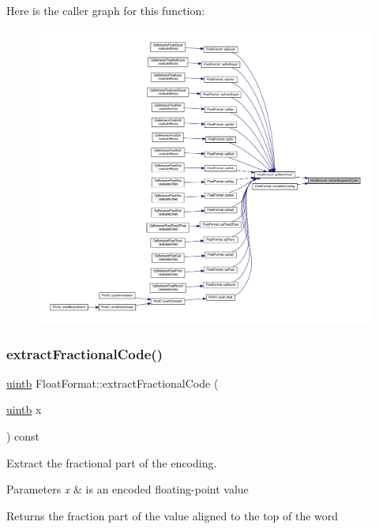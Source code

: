 Here is the caller graph for this function\+:
\nopagebreak
\begin{figure}[H]
\begin{center}
\leavevmode
\includegraphics[width=350pt]{class_float_format_a266d06329a88845bbc202b87141f64df_icgraph}
\end{center}
\end{figure}
\mbox{\label{class_float_format_af06109651ce301156e5a384c946e7780}} 
\subsubsection{\texorpdfstring{extractFractionalCode()}{extractFractionalCode()}}
{\footnotesize\ttfamily \mbox{\hyperlink{types_8h_a2db313c5d32a12b01d26ac9b3bca178f}{uintb}} Float\+Format\+::extract\+Fractional\+Code (\begin{DoxyParamCaption}\item[{\mbox{\hyperlink{types_8h_a2db313c5d32a12b01d26ac9b3bca178f}{uintb}}}]{x }\end{DoxyParamCaption}) const}



Extract the fractional part of the encoding. 


\begin{DoxyParams}{Parameters}
{\em x} & is an encoded floating-\/point value \\
\hline
\end{DoxyParams}
\begin{DoxyReturn}{Returns}
the fraction part of the value aligned to the top of the word 
\end{DoxyReturn}


